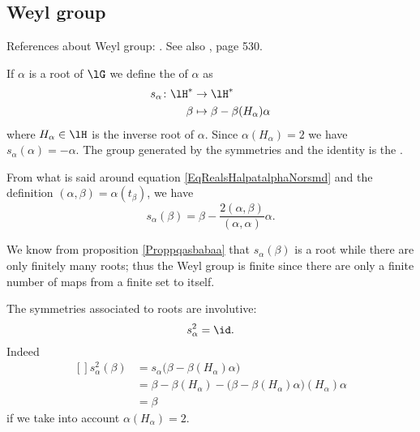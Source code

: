 \subsection{Weyl group}
References about Weyl group: \cite{Knapp_reprez}. See also \cite{Cornwell}, page 530.

If \( \alpha\) is a root of \( \lG\) we define the  of \( \alpha\) as
\begin{equation}
    \begin{aligned}
        s_{\alpha}\colon \lH^*&\to \lH^* \\
        \beta&\mapsto \beta-\beta(H_{\alpha})\alpha
    \end{aligned}
\end{equation}
where \( H_{\alpha}\in\lH\) is the inverse root of \( \alpha\). Since \( \alpha(H_{\alpha})=2\) we have \( s_{\alpha}(\alpha)=-\alpha\). The group generated by the symmetries and the identity is the .

From what is said around equation \eqref{EqRealsHalpatalphaNorsmd} and the definition \( (\alpha,\beta)=\alpha(t_{\beta})\), we have
\begin{equation}
    s_{\alpha}(\beta)=\beta-\frac{ 2(\alpha,\beta) }{ (\alpha,\alpha) }\alpha.
\end{equation}

We know from proposition \ref{Proppqasbabaa} that \( s_{\alpha}(\beta)\) is a root while there are only finitely many roots; thus the Weyl group is finite since there are only a finite number of maps from a finite set to itself.

The symmetries associated to roots are involutive:
\begin{equation}
    s_{\alpha}^2=\id.
\end{equation}
Indeed
\begin{equation}
    \begin{aligned}[]
        s^2_{\alpha}(\beta)&=s_{\alpha}\big( \beta-\beta(H_{\alpha})\alpha \big)\\
        &=\beta-\beta(H_{\alpha})-\big( \beta-\beta(H_{\alpha})\alpha \big)(H_{\alpha})\alpha\\
        &=\beta
    \end{aligned}
\end{equation}
if we take into account \( \alpha(H_{\alpha})=2\).

